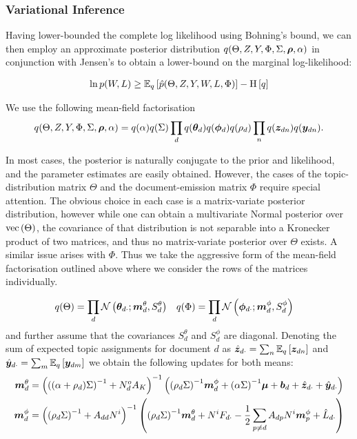 \subsubsection*{Variational Inference}
Having lower-bounded the complete log likelihood using Bohning's bound, we can then employ an approximate posterior distribution $q(\Theta, Z, Y, \Phi, \Sigma, \vv{\rho}, \alpha)$ in conjunction with Jensen's to obtain a lower-bound on the marginal log-likelihood:

\begin{align}
\ln p(W, L) \geq \ex{\hat{p}(\Theta, Z, Y, W, L, \Phi)}{q} - \ent{q}
\end{align}

We use the following mean-field factorisation
\begin{align}
q(\Theta, Z, Y, \Phi, \Sigma, \vv{\rho}, \alpha) = q(\alpha)q(\Sigma)\prod_d q(\thd)q(\vv{\phi}_d)q(\rho_d)\prod_n q(\vv{z}_{dn})q(\vv{y}_{dn}).
\end{align}

In most cases, the posterior is naturally conjugate to the prior and likelihood, and the parameter estimates are easily obtained. However, the cases of the topic-distribution matrix $\Theta$ and the document-emission matrix $\Phi$ require special attention. The obvious choice in each case is a matrix-variate posterior distribution, however while one can obtain a multivariate Normal posterior over $\vecf{\Theta}$, the covariance of that distribution is not separable into a Kronecker product of two matrices, and thus no matrix-variate posterior over $\Theta$ exists. A similar issue arises with $\Phi$. Thus we take the aggressive form of the mean-field factorisation outlined above where we consider the rows of the matrices individually.

\newcommand \mtd { { \vv{m}^{\theta}_d } }
\newcommand \std { { S^\theta_d } }
\newcommand \mpd { { \vv{m}^{\phi}_d } }
\newcommand \spd { { S^\phi_d } }

\begin{align}
q(\Theta) &= \prod_d \mathcal{N}\left(\thdo; \mtd, \std \right) &
q(\Phi) &= \prod_d \mathcal{N}\left(\phdo; \mpd, \spd\right) 
\end{align}
and further assume that the covariances $\std$ and $\spd$ are diagonal. Denoting the sum of expected topic assignments for document $d$ as $\hat{\vv{z}}_{d\cdot} = \sum_n \ex{\vv{z}_{dn}}{q}$ and $\hat{\vv{y}}_{d\cdot} = \sum_m \ex{\vv{y}_{dm}}{q}$ we obtain the following updates for both means:
\begin{align}
\mtd &= \invb{ \invb{(\alpha + \rho_d)\Sigma} + N^o_d A_K }
            \left(
                \invb{\rho_d \Sigma} \mpd
                + \invb{\alpha \Sigma}\vv{\mu}
                + \vv{b}_d 
                + \hat{\vv{z}}_{d\cdot}
                + \hat{\vv{y}}_{d\cdot}
            \right) \\
 \mpd & = \invb{\invb{\rho_d \Sigma} + A_{dd}N^i}
             \left(
                 \invb{\rho_d \Sigma}\mtd + N^i F_{d\cdot} -\half \sum_{p \neq d} A_{dp} N^i \vv{m}^\phi_p + \hat{L}_{d\cdot}
             \right)
 \end{align}
 
